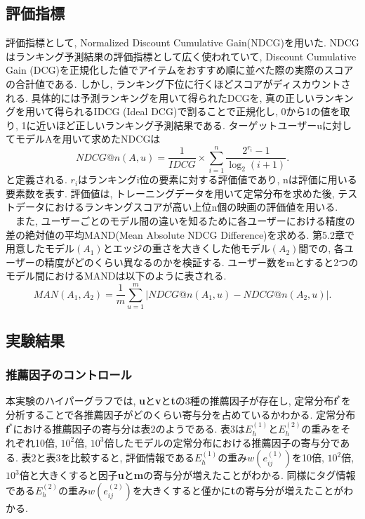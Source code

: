 \documentclass[a4j,11pt]{jarticle}           %
\begin{document}
	\subsection{評価指標}
	評価指標として, Normalized Discount Cumulative Gain(NDCG)を用いた. NDCGはランキング予測結果の評価指標として広く使われていて, Discount Cumulative Gain (DCG)を正規化した値でアイテムをおすすめ順に並べた際の実際のスコアの合計値である. しかし, ランキング下位に行くほどスコアがディスカウントされる. 具体的には予測ランキングを用いて得られたDCGを, 真の正しいランキングを用いて得られるIDCG (Ideal DCG)で割ることで正規化し, 0から1の値を取り, 1に近いほど正しいランキング予測結果である. 
	ターゲットユーザーuに対してモデルAを用いて求めたNDCGは
	\begin{equation}
		NDCG@n(A,u)=\frac{1}{IDCG}\times\sum_{i=1}^n\frac{2^{r_i}-1}{\log_2(i+1)}.
	\end{equation}
	と定義される. $r_i$はランキングi位の要素に対する評価値であり, nは評価に用いる要素数を表す. 評価値は, トレーニングデータを用いて定常分布を求めた後, テストデータにおけるランキングスコアが高い上位n個の映画の評価値を用いる.　
	\\　また, ユーザーごとのモデル間の違いを知るために各ユーザーにおける精度の差の絶対値の平均MAND(Mean Absolute NDCG Difference)を求める. 
	第5.2章で用意したモデル$(A_1)$とエッジの重さを大きくした他モデル$(A_2)$間での, 各ユーザーの精度がどのくらい異なるのかを検証する. 
	ユーザー数をmとすると2つのモデル間におけるMANDは以下のように表される. 
	\begin{equation}
		MAN(A_1,A_2)=\frac{1}{m}\sum_{u=1}^m|NDCG@n(A_1,u)-NDCG@n(A_2,u)|.
	\end{equation}
	
	\subsection{実験結果}
	\subsubsection{推薦因子のコントロール}
	本実験のハイパーグラフでは, \textbf{u}と\textbf{v}と\textbf{t}の3種の推薦因子が存在し, 定常分布$\textbf{f}^*$を分析することで各推薦因子がどのくらい寄与分を占めているかわかる. 定常分布$\textbf{f}^*$における推薦因子の寄与分は表2のようである. 表3は$E_h^{(1)}$と$E_h^{(2)}$の重みをそれぞれ10倍, $10^2$倍, $10^3$倍したモデルの定常分布における推薦因子の寄与分である.
	表2と表3を比較すると, 評価情報である$E_h^{(1)}$の重み$w(e_{ij}^{(1)})$を10倍, $10^2$倍, $10^3$倍と大きくすると因子\textbf{u}と\textbf{m}の寄与分が増えたことがわかる. 同様にタグ情報である$E_h^{(2)}$の重み$w(e_{ij}^{(2)})$を大きくすると僅かに\textbf{t}の寄与分が増えたことがわかる. 
	
\end{document}
